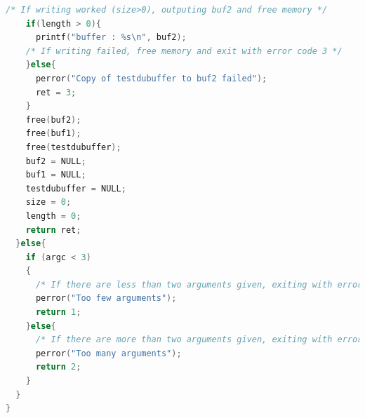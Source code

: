 \begin{lstlisting}[language=C]
    /* If writing worked (size>0), outputing buf2 and free memory */
    if(length > 0){
      printf("buffer : %s\n", buf2);
    /* If writing failed, free memory and exit with error code 3 */
    }else{
      perror("Copy of testdubuffer to buf2 failed");
      ret = 3;
    }
    free(buf2);
    free(buf1);
    free(testdubuffer);
    buf2 = NULL;
    buf1 = NULL;
    testdubuffer = NULL;
    size = 0;
    length = 0;
    return ret;
  }else{
    if (argc < 3)
    {
      /* If there are less than two arguments given, exiting with error code 1 */
      perror("Too few arguments");
      return 1;
    }else{
      /* If there are more than two arguments given, exiting with error code 2 */
      perror("Too many arguments");
      return 2;
    }
  }
}
\end{lstlisting}
